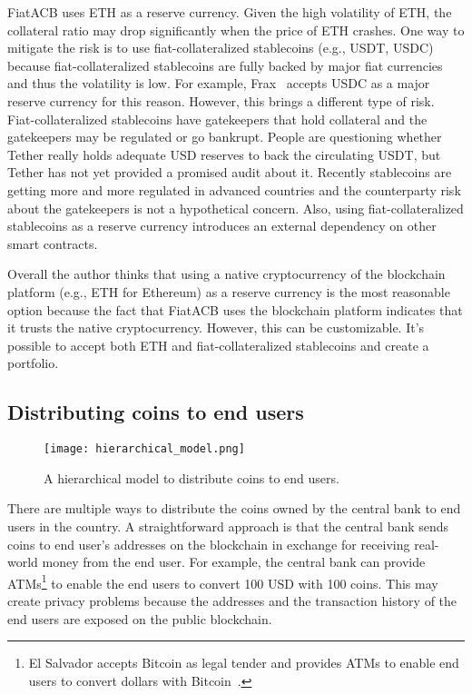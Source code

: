 \documentclass[dvipdfmx,a4paper]{article}
\begin{document}
FiatACB uses ETH as a reserve currency. Given the high volatility of ETH, the collateral ratio may drop significantly when the price of ETH crashes. One way to mitigate the risk is to use fiat-collateralized stablecoins (e.g., USDT, USDC) because fiat-collateralized stablecoins are fully backed by major fiat currencies and thus the volatility is low. For example, Frax~\cite{frax} accepts USDC as a major reserve currency for this reason. However, this brings a different type of risk. Fiat-collateralized stablecoins have gatekeepers that hold collateral and the gatekeepers may be regulated or go bankrupt. People are questioning whether Tether really holds adequate USD reserves to back the circulating USDT, but Tether has not yet provided a promised audit about it. Recently stablecoins are getting more and more regulated in advanced countries and the counterparty risk about the gatekeepers is not a hypothetical concern. Also, using fiat-collateralized stablecoins as a reserve currency introduces an external dependency on other smart contracts.

Overall the author thinks that using a native cryptocurrency of the blockchain platform (e.g., ETH for Ethereum) as a reserve currency is the most reasonable option because the fact that FiatACB uses the blockchain platform indicates that it trusts the native cryptocurrency. However, this can be customizable. It's possible to accept both ETH and fiat-collateralized stablecoins and create a portfolio.

\subsection{Distributing coins to end users}

\begin{figure}[tb]
\centering
\texttt{[image: hierarchical\_model.png]}
\caption{A hierarchical model to distribute coins to end users.}
\label{hierarchical_model}
\end{figure}

There are multiple ways to distribute the coins owned by the central bank to end users in the country. A straightforward approach is that the central bank sends coins to end user's addresses on the blockchain in exchange for receiving real-world money from the end user. For example, the central bank can provide ATMs\footnote{El Salvador accepts Bitcoin as legal tender and provides ATMs to enable end users to convert dollars with Bitcoin~\cite{elsalvador}.} to enable the end users to convert 100 USD with 100 coins. This may create privacy problems because the addresses and the transaction history of the end users are exposed on the public blockchain.
\end{document}
